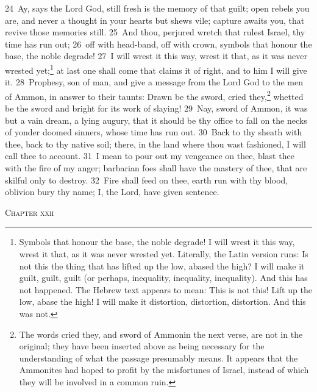 \documentclass[10pt]{book} %
\begin{document}
\textcolor{benred8}{24}~Ay, says the Lord God, still fresh is the memory of that guilt; open rebels you are, and never a thought in your hearts but shews vile; capture awaits you, that revive those memories still. \textcolor{benred8}{25}~And thou, perjured wretch that rulest Israel, thy time has run out; \textcolor{benred8}{26}~off with head-band, off with crown, symbols that honour the base, the noble degrade! \textcolor{benred8}{27}~I will wrest it this way, wrest it that, as it was never wrested yet;\footnote[4]{\textasciigrave Symbols that honour the base, the noble degrade! I will wrest it this way, wrest it that, as it was never wrested yet\textquotesingle . Literally, the Latin version runs: \textasciigrave Is not this the thing that has lifted up the low, abased the high? I will make it guilt, guilt, guilt (or perhaps, inequality, inequality, inequality). And this has not happened\textquotesingle . The Hebrew text appears to mean: \textasciigrave This is not this! Lift up the low, abase the high! I will make it distortion, distortion, distortion. And this was not\textquotesingle .} at last one shall come that claims it of right, and to him I will give it.
\textcolor{benred8}{28}~Prophesy, son of man, and give a message from the Lord God to the men of Ammon, in answer to their taunts: Drawn be the sword, cried they,\footnote[5]{The words \textasciigrave cried they\textquotesingle , and \textasciigrave sword of Ammon\textquotesingle  in the next verse, are not in the original; they have been inserted above as being necessary for the understanding of what the passage presumably means. It appears that the Ammonites had hoped to profit by the misfortunes of Israel, instead of which they will be involved in a common ruin.} whetted be the sword and bright for its work of slaying! \textcolor{benred8}{29}~Nay, sword of Ammon, it was but a vain dream, a lying augury, that it should be thy office to fall on the necks of yonder doomed sinners, whose time has run out. \textcolor{benred8}{30}~Back to thy sheath with thee, back to thy native soil; there, in the land where thou wast fashioned, I will call thee to account. \textcolor{benred8}{31}~I mean to pour out my vengeance on thee, blast thee with the fire of my anger; barbarian foes shall have the mastery of thee, that are skilful only to destroy. \textcolor{benred8}{32}~Fire shall feed on thee, earth run with thy blood, oblivion bury thy name; I, the Lord, have given sentence.
\begin{large}\begin{center}\textsc{Chapter xxii}\end{center}\end{large}
\end{document}
